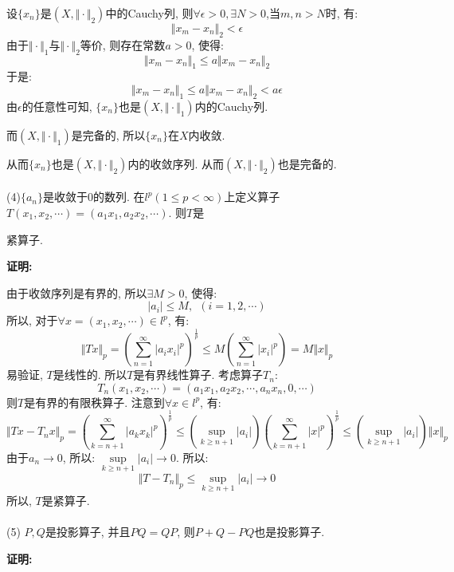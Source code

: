\documentclass{article}
\begin{document}
设$\{x_{n} \}$是$(X, \Vert \cdot \Vert_2)$中的Cauchy列, 则$\forall \epsilon>0, \exists N>0$,当$m,n>N$时, 有:
$$ \Vert x_m - x_n \Vert_2 < \epsilon $$
由于$\Vert \cdot \Vert_1$与$\Vert \cdot \Vert_2$等价, 则存在常数$a>0$, 使得:
$$ \Vert x_m - x_n  \Vert_1 \leq a\Vert x_m - x_n \Vert_2 $$
于是:
$$ \Vert x_m - x_n \Vert_1 \leq a\Vert x_m - x_n \Vert_2 < a\epsilon $$
由$\epsilon$的任意性可知, $\{x_n\}$也是$(X, \Vert \cdot \Vert_1)$内的Cauchy列.

而$(X, \Vert \cdot \Vert_1)$是完备的, 所以$\{ x_n \}$在$X$内收敛.

从而$\{x_n \}$也是$(X, \Vert \cdot \Vert_2)$内的收敛序列. 从而$(X, \Vert \cdot \Vert_2)$也是完备的. \\ \\



(4)$\{ a_n \}$是收敛于$0$的数列. 在$l^p(1 \leq p < \infty)$上定义算子$T(x_1, x_2, \cdots ) = (a_1x_1, a_2x_2, \cdots)$. 则$T$是

\hspace{1.3em} 紧算子. 

\textbf{证明:}

由于收敛序列是有界的, 所以$\exists M>0$, 使得:
$$  |a_i| \leq M, \ \ (i=1,2,\cdots) $$
所以, 对于$\forall x=(x_1, x_2, \cdots) \in l^p$, 有:
$$ \Vert Tx \Vert_p = \left( \sum\limits_{n=1}^{\infty} |a_ix_i|^p \right)^{\frac{1}{p}} \leq M\left( \sum\limits_{n=1}^{\infty} |x_i|^p \right) = M \Vert x \Vert_p $$
易验证, $T$是线性的. 所以$T$是有界线性算子. 考虑算子$T_n:$
$$ T_n(x_1, x_2, \cdots) = (a_1x_1, a_2x_2, \cdots, a_nx_n, 0, \cdots) $$
则$T$是有界的有限秩算子. 注意到$\forall x \in l^p$, 有:
$$ \Vert Tx - T_nx \Vert_p = \left( \sum\limits_{k=n+1}^{\infty} |a_kx_k|^p \right)^{\frac{1}{p}} \leq \left( \sup\limits_{k \geq n+1} |a_i| \right) \left(\sum\limits_{k=n+1}^{\infty} |x|^p \right)^{\frac{1}{p}} \leq \left( \sup\limits_{k \geq n+1} |a_i| \right) \Vert x \Vert_p  $$
由于$a_n \rightarrow 0$, 所以: $\sup\limits_{k \geq n+1} |a_i| \rightarrow 0$. 所以:
$$ \Vert T - T_n \Vert_p \leq \sup\limits_{k \geq n+1} |a_i| \rightarrow 0 $$
所以, $T$是紧算子. \\  \\


(5) $P, Q$是投影算子, 并且$PQ=QP$, 则$P+Q-PQ$也是投影算子. 

\textbf{证明:}
\end{document}
